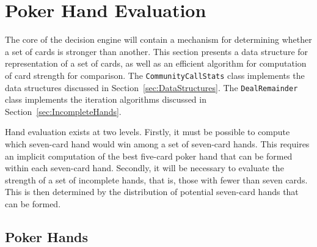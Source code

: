 
\newcommand{\xs}{$\spadesuit$}
\newcommand{\xh}{$\heartsuit$}
\newcommand{\xc}{$\clubsuit$}
\newcommand{\xd}{$\diamondsuit$}



\clearpage


\chapter{Poker Hand Evaluation}
\label{sec:HandEvaluation}

The core of the decision engine will contain a mechanism for determining whether a set of cards is stronger than another.
This section presents a data structure for representation of a set of cards, as well as an efficient algorithm for computation of card strength for comparison.
The \texttt{CommunityCallStats} class implements the data structures discussed in Section~\ref{sec:DataStructures}.
The \texttt{DealRemainder} class implements the iteration algorithms discussed in Section~\ref{sec:IncompleteHands}.





Hand evaluation exists at two levels.
Firstly, it must be possible to compute which seven-card hand would win among a set of seven-card hands.
This requires an implicit computation of the best five-card poker hand that can be formed within each seven-card hand.
Secondly, it will be necessary to evaluate the strength of a set of incomplete hands, that is, those with fewer than seven cards.
This is then determined by the distribution of potential seven-card hands that can be formed.


\section{Poker Hands}
\label{sec:PokerHands}


